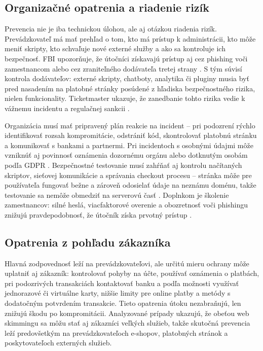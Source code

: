 \subsection{Organizačné opatrenia a riadenie rizík}

Prevencia nie je iba technickou úlohou, ale aj otázkou riadenia rizík. Prevádzkovateľ má mať prehľad o tom, kto má prístup k administrácii, kto môže meniť skripty, kto schvaľuje nové externé služby a ako sa kontroluje ich bezpečnosť. FBI upozorňuje, že útočníci získavajú prístup aj cez phishing voči zamestnancom alebo cez zraniteľného dodávateľa tretej strany \cite{fbi2019eskimming}. S tým súvisí kontrola dodávateľov: externé skripty, chatboty, analytika či pluginy musia byť pred nasadením na platobné stránky posúdené z hľadiska bezpečnostného rizika, nielen funkcionality. Ticketmaster ukazuje, že zanedbanie tohto rizika vedie k vážnemu incidentu a regulačnej sankcii \cite{ico2020Ticketmaster}.

Organizácia musí mať pripravený plán reakcie na incident -- pri podozrení rýchlo identifikovať rozsah kompromitácie, odstrániť kód, skontrolovať platobnú stránku a komunikovať s bankami a partnermi. Pri incidentoch s osobnými údajmi môže vzniknúť aj povinnosť oznámenia dozornému orgánu alebo dotknutým osobám podľa GDPR \cite{gdpr2016}. Bezpečnostné testovanie musí zahŕňať aj kontrolu načítaných skriptov, sieťovej komunikácie a správania checkout procesu -- stránka môže pre používateľa fungovať bežne a zároveň odosielať údaje na neznámu doménu, takže testovanie sa nemôže obmedziť na serverovú časť \cite{pciSsc2025PaymentPage,owaspClientSideTop10}. Doplnkom je školenie zamestnancov: silné heslá, viacfaktorové overenie a obozretnosť voči phishingu znižujú pravdepodobnosť, že útočník získa prvotný prístup \cite{fbi2019eskimming}.

\subsection{Opatrenia z pohľadu zákazníka}

Hlavná zodpovednosť leží na prevádzkovateľovi, ale určitú mieru ochrany môže uplatniť aj zákazník: kontrolovať pohyby na účte, používať oznámenia o platbách, pri podozrivých transakciách kontaktovať banku a podľa možnosti využívať jednorazové či virtuálne karty, nižšie limity pre online platby a metódy s dodatočným potvrdením transakcie. Tieto opatrenia útoku nezabraňujú, len znižujú škodu po kompromitácii. Analyzované prípady ukazujú, že obeťou web skimmingu sa môžu stať aj zákazníci veľkých služieb, takže skutočná prevencia leží predovšetkým na prevádzkovateľoch e-shopov, platobných stránok a poskytovateľoch externých služieb.


